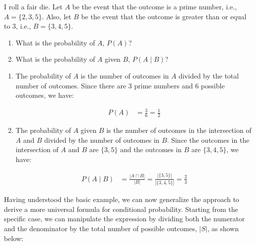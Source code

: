 \begin{example}
I roll a fair die. Let \( A \) be the event that the outcome is a prime number, i.e., \( A = \{2, 3, 5\} \). Also, let \( B \) be the event that the outcome is greater than or equal to 3, i.e., \( B = \{3, 4, 5\} \). 

\begin{enumerate}[label=(\alph*)]
    \item What is the probability of \( A \), \( P(A) \)?
    \item What is the probability of \( A \) given \( B \), \( P(A \mid B) \)?
\end{enumerate}

\end{example}

\begin{solution}
    \begin{enumerate}[label=(\alph*)]
        \item The probability of \( A \) is the number of outcomes in \( A \) divided by the total number of outcomes. Since there are 3 prime numbers and 6 possible outcomes, we have:
    
        \begin{align*}
        P(A) &= \frac{3}{6} = \frac{1}{2}
        \end{align*}
    
        \item The probability of \( A \) given \( B \) is the number of outcomes in the intersection of \( A \) and \( B \) divided by the number of outcomes in \( B \). Since the outcomes in the intersection of \( A \) and \( B \) are \(\{3, 5\}\) and the outcomes in \( B \) are \(\{3, 4, 5\}\), we have: \vspace{0.4cm}
    
        \begin{align*}
        P(A \mid B) &=\frac{|A \cap B|}{|B|} = \frac{|\{3,5\}|}{|\{3,4, 5\}|} = \frac{2}{3}
        \end{align*}

    \end{enumerate}
\end{solution}

Having understood the basic example, we can now generalize the approach to derive a more universal formula for conditional probability. Starting from the specific case, we can manipulate the expression by dividing both the numerator and the denominator by the total number of possible outcomes, \( |S| \), as shown below:

